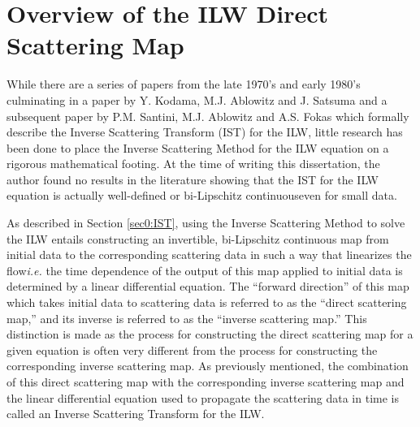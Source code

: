 \documentclass[../dissertation.tex]{subfiles}
\begin{document}
\section{Overview of the ILW Direct Scattering Map}\label{sec0:DM}

While there are a series of papers from the late 1970's and early 1980's 
culminating in a paper by Y. Kodama, M.J. Ablowitz and J. Satsuma 
\cite{Kodama1982} and a subsequent paper by P.M. Santini, M.J. Ablowitz and A.S. 
Fokas \cite{Santini1984} which formally describe the Inverse Scattering 
Transform (IST) for the ILW, little research has been done to place the Inverse 
Scattering Method for the ILW equation on a rigorous mathematical footing. 
At the time of writing this dissertation, the author found no results in the 
literature showing that the IST for the ILW equation is actually well-defined
or bi-Lipschitz continuous\textemdash{}even for small data.

As described in Section \ref{sec0:IST}, using the Inverse
Scattering Method to solve the ILW entails constructing 
an invertible, bi-Lipschitz
continuous map from initial data to the corresponding scattering data in such 
a way that linearizes the flow\textemdash{}\textit{i.e.} the time dependence 
of the output of this map applied to initial data is determined by a linear 
dif{}ferential equation. The ``forward
direction'' of this map which takes initial data to scattering data is referred to 
as the ``direct scattering map,'' and its inverse
is referred to as the ``inverse scattering map.'' This distinction is made as the process for 
constructing the direct scattering map for a given equation is often very dif{}ferent from
the process for constructing the corresponding inverse scattering map. As previously mentioned,
the combination of this direct scattering map with the corresponding inverse 
scattering map and the linear differential equation used to propagate the scattering data in 
time is called an Inverse Scattering Transform for the ILW.
\end{document}
